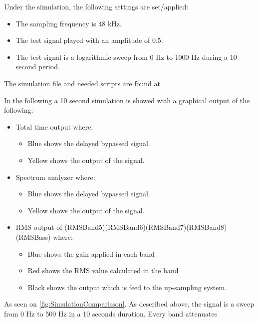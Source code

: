 Under the simulation, the following settings are set/applied:
\begin{itemize}
\item The sampling frequency is 48 kHz.
\item The test signal played with an amplitude of 0.5.
\item The test signal is a logarithmic sweep from 0 Hz to 1000 Hz during a 10 second period.
\end{itemize}

The simulation file and needed scripts are found at  


In the following a 10 second simulation is showed with a graphical output of the following:
\begin{itemize}
\item Total time output where:
\begin{itemize}
\item Blue shows the delayed bypassed signal.
\item Yellow shows the output of the signal.
\end{itemize}
\item Spectrum analyzer where:
\begin{itemize}
\item Blue shows the delayed bypassed signal.
\item Yellow shows the output of the signal.
\end{itemize}
\item RMS output of (RMSBand5)(RMSBand6)(RMSBand7)(RMSBand8)(RMSBass) where:
\begin{itemize}
\item Blue shows the gain applied in each band
\item Red shows the RMS value calculated in the band
\item Black shows the output which is feed to the up-sampling system.
\end{itemize} 
\end{itemize}


As seen on \autoref{fig:SimulationComparisson}. As described above, the signal is a sweep from 0 Hz to 500 Hz in a 10 seconds duration. Every band attenuates 


